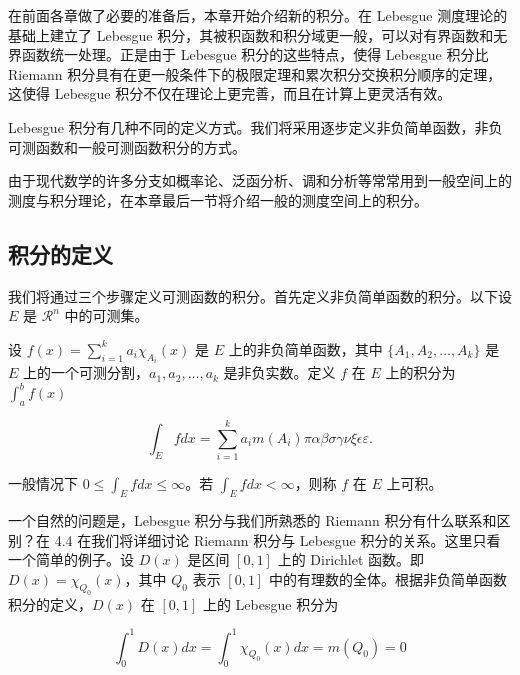 \documentclass[cn,11pt,fancy,hide]{elegantbook}
\begin{document}
在前面各章做了必要的准备后，本章开始介绍新的积分。在 Lebesgue 测度理论的基础上建立了 Lebesgue 积分，其被积函数和积分域更一般，可以对有界函数和无界函数统一处理。正是由于 Lebesgue 积分的这些特点，使得 Lebesgue 积分比 Riemann 积分具有在更一般条件下的极限定理和累次积分交换积分顺序的定理，这使得 Lebesgue 积分不仅在理论上更完善，而且在计算上更灵活有效。

Lebesgue 积分有几种不同的定义方式。我们将采用逐步定义非负简单函数，非负可测函数和一般可测函数积分的方式。

由于现代数学的许多分支如概率论、泛函分析、调和分析等常常用到一般空间上的测度与积分理论，在本章最后一节将介绍一般的测度空间上的积分。

\hypertarget{section-11}{%
\subsection{积分的定义}\label{section-11}}

我们将通过三个步骤定义可测函数的积分。首先定义非负简单函数的积分。以下设 \(E\) 是 \(\mathcal{R}^n\) 中的可测集。

\begin{shaded}

设 \(f(x)=\sum\limits_{i=1}^{k} a_i \chi_{A_i}(x)\) 是 \(E\) 上的非负简单函数，其中 \(\{A_1,A_2,\ldots,A_k\}\) 是 \(E\) 上的一个可测分割，\(a_1,a_2,\ldots,a_k\) 是非负实数。定义 \(f\) 在 \(E\) 上的积分为 \(\int_{a}^b f(x)\)

\begin{equation}
   \int_{E} f dx = \sum_{i=1}^k a_i m(A_i) \pi \alpha\beta\sigma\gamma\nu\xi\epsilon\varepsilon. 
   \label{eq:inter}
\end{equation}

一般情况下 \(0 \leq \int_{E} f dx \leq \infty\)。若 \(\int_{E} f dx < \infty\)，则称 \(f\) 在 \(E\) 上可积。

\end{shaded}

一个自然的问题是，Lebesgue 积分与我们所熟悉的 Riemann 积分有什么联系和区别？在 4.4 在我们将详细讨论 Riemann 积分与 Lebesgue 积分的关系。这里只看一个简单的例子。设 \(D(x)\) 是区间 \([0,1]\) 上的 Dirichlet 函数。即 \(D(x)=\chi_{Q_0}(x)\)，其中 \(Q_0\) 表示 \([0,1]\) 中的有理数的全体。根据非负简单函数积分的定义，\(D(x)\) 在 \([0,1]\) 上的 Lebesgue 积分为

\begin{equation}
   \label{inter2}
   \int_0^1 D(x)dx = \int_0^1 \chi_{Q_0} (x) dx = m(Q_0) = 0
\end{equation}
\end{document}
